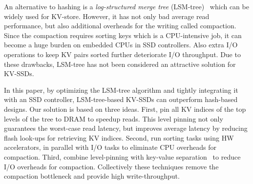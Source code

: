 \documentclass{abstract_hutech}
\begin{document}

An alternative to hashing is a \emph{log-structured merge tree} (LSM-tree)~\cite{lsm-tree} which can be widely used for KV-store.
However, it has not only bad average read performance, 
but also additional overheads for the writing called compaction.
Since the compaction requires sorting keys which is a CPU-intensive job,
it can become a huge burden on embedded CPUs in SSD controllers. 
Also extra I/O operations to keep KV pairs sorted further deteriorate I/O throughput.  
Due to these drawbacks, LSM-tree has not been considered an attractive solution for KV-SSDs.

%
In this paper, by optimizing the LSM-tree algorithm and tightly integrating it with an SSD controller, LSM-tree-based KV-SSDs can outperform hash-based designs.  
Our solution is based on three ideas.
First, pin all KV indices of the top levels of the tree to DRAM to speedup reads.
This level pinning not only guarantees the worst-case read latency, but improves average latency by reducing flash look-ups for retrieving KV indices.  
Second, run sorting tasks using HW accelerators, in parallel with I/O tasks to eliminate CPU overheads for compaction.
Third, combine level-pinning with key-value separation~\cite{wisckey} to reduce I/O overheads for compaction.
Collectively these techniques remove the compaction bottleneck and provide high write-throughput.
\end{document}
